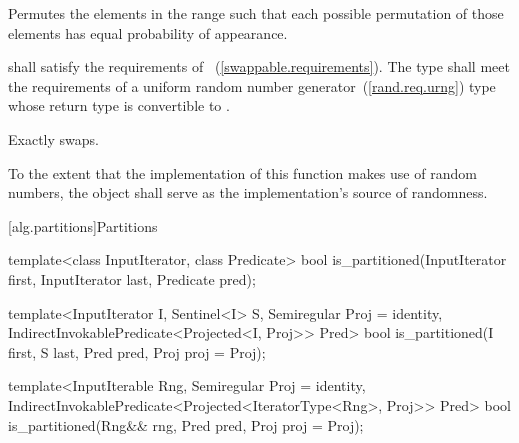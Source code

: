 \begin{itemdescr}
\pnum
\effects
Permutes the elements in the range
such that each possible permutation of those elements has equal probability of appearance.

\begin{removedblock}
\pnum
\requires
{} shall satisfy the requirements of
~(\ref{swappable.requirements}).
The type
 shall meet the requirements of a uniform
random number generator~(\ref{rand.req.urng}) type whose return type is
convertible to
.
\end{removedblock}

\pnum
\complexity
Exactly
swaps.

\begin{addedblock}
\pnum
\returns {}
\end{addedblock}

\pnum
\notes
To the extent that the implementation of this function makes use of random
numbers, the object  shall serve as the implementation's source of
randomness.

\end{itemdescr}

[alg.partitions]{Partitions}

%
\begin{removedblock}
\begin{itemdecl}
template<class InputIterator, class Predicate>
  bool is_partitioned(InputIterator first, InputIterator last, Predicate pred);
\end{itemdecl}
\end{removedblock}
\begin{addedblock}
\begin{itemdecl}
template<InputIterator I, Sentinel<I> S, Semiregular Proj = identity,
    IndirectInvokablePredicate<Projected<I, Proj>> Pred>
  bool is_partitioned(I first, S last, Pred pred, Proj proj = Proj{});

template<InputIterable Rng, Semiregular Proj = identity,
    IndirectInvokablePredicate<Projected<IteratorType<Rng>, Proj>> Pred>
  bool
    is_partitioned(Rng&& rng, Pred pred, Proj proj = Proj{});
\end{itemdecl}
\end{addedblock}


